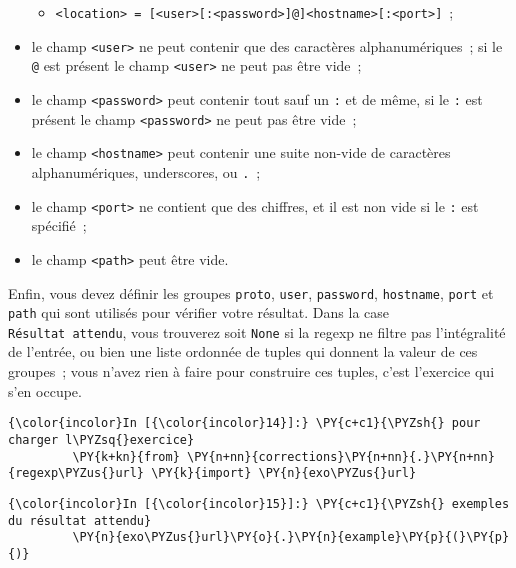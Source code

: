 \begin{itemize}
  \begin{itemize}
  \tightlist
  \item
    \texttt{\textless{}location\textgreater{}\ =\ {[}\textless{}user\textgreater{}{[}:\textless{}password\textgreater{}{]}@{]}\textless{}hostname\textgreater{}{[}:\textless{}port\textgreater{}{]}}~;
  \end{itemize}
\item
  le champ \texttt{\textless{}user\textgreater{}} ne peut contenir que
  des caractères alphanumériques~; si le \texttt{@} est présent le champ
  \texttt{\textless{}user\textgreater{}} ne peut pas être vide~;
\item
  le champ \texttt{\textless{}password\textgreater{}} peut contenir tout
  sauf un \texttt{:} et de même, si le \texttt{:} est présent le champ
  \texttt{\textless{}password\textgreater{}} ne peut pas être vide~;
\item
  le champ \texttt{\textless{}hostname\textgreater{}} peut contenir une
  suite non-vide de caractères alphanumériques, underscores, ou
  \texttt{.}~;
\item
  le champ \texttt{\textless{}port\textgreater{}} ne contient que des
  chiffres, et il est non vide si le \texttt{:} est spécifié~;
\item
  le champ \texttt{\textless{}path\textgreater{}} peut être vide.
\end{itemize}

Enfin, vous devez définir les groupes \texttt{proto}, \texttt{user},
\texttt{password}, \texttt{hostname}, \texttt{port} et \texttt{path} qui
sont utilisés pour vérifier votre résultat. Dans la case
\texttt{Résultat\ attendu}, vous trouverez soit \texttt{None} si la
regexp ne filtre pas l'intégralité de l'entrée, ou bien une liste
ordonnée de tuples qui donnent la valeur de ces groupes~; vous n'avez
rien à faire pour construire ces tuples, c'est l'exercice qui s'en
occupe.

    \begin{Verbatim}[commandchars=\\\{\}]
{\color{incolor}In [{\color{incolor}14}]:} \PY{c+c1}{\PYZsh{} pour charger l\PYZsq{}exercice}
         \PY{k+kn}{from} \PY{n+nn}{corrections}\PY{n+nn}{.}\PY{n+nn}{regexp\PYZus{}url} \PY{k}{import} \PY{n}{exo\PYZus{}url}
\end{Verbatim}


    \begin{Verbatim}[commandchars=\\\{\}]
{\color{incolor}In [{\color{incolor}15}]:} \PY{c+c1}{\PYZsh{} exemples du résultat attendu}
         \PY{n}{exo\PYZus{}url}\PY{o}{.}\PY{n}{example}\PY{p}{(}\PY{p}{)}
\end{Verbatim}


